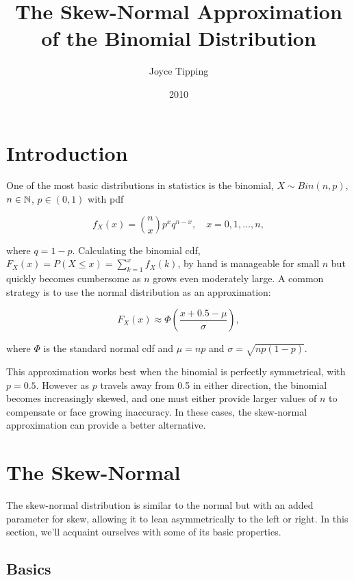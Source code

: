 \documentclass{article}
\begin{document}
\title{The Skew-Normal Approximation of the Binomial Distribution}
\author{Joyce Tipping}
\date{2010}
\maketitle

\section{Introduction}

One of the most basic distributions in statistics is the binomial, $X \sim
Bin(n,p)$, $n \in \mathbb{N}$, $p \in (0, 1)$ with pdf

\begin{equation*}
  f_X(x) = \binom{n}{x} p^x q^{n-x}, \quad x = 0, 1, \ldots, n,
\end{equation*}

where $q=1-p$. Calculating the binomial cdf, $F_X(x) = P(X \leq x) =
\sum_{k=1}^x f_X(k)$, by hand is manageable for small $n$ but quickly becomes
cumbersome as $n$ grows even moderately large. A common strategy is to use the
normal distribution as an approximation:

\begin{equation}
  F_X(x) \approx \Phi \left( \frac{x + 0.5 - \mu}{\sigma} \right),
\end{equation}

where $\Phi$ is the standard normal cdf and $\mu = np$ and $\sigma =
\sqrt{np(1-p)}$.

This approximation works best when the binomial is perfectly symmetrical, with
$p=0.5$. However as $p$ travels away from 0.5 in either direction, the binomial
becomes increasingly skewed, and one must either provide larger values of $n$
to compensate or face growing inaccuracy. In these cases, the skew-normal
approximation can provide a better alternative.

\section{The Skew-Normal}

The skew-normal distribution is similar to the normal but with an added
parameter for skew, allowing it to lean asymmetrically to the left or right. In
this section, we'll acquaint ourselves with some of its basic properties.

\subsection{Basics}
\end{document}
